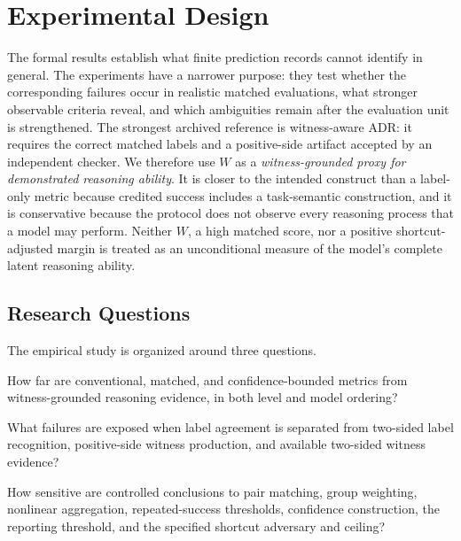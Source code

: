 \documentclass[acmsmall,screen,review,anonymous]{acmart}
\providecommand{\WitnessRate}{W}
\newcounter{experiment}
\begin{document}
\section{Experimental Design}
\label{sec:experimental-design}

The formal results establish what finite prediction records cannot identify in
general. The experiments have a narrower purpose: they test whether the
corresponding failures occur in realistic matched evaluations, what stronger
observable criteria reveal, and which ambiguities remain after the evaluation
unit is strengthened. The strongest archived reference is witness-aware ADR:
it requires the correct matched labels and a positive-side artifact accepted by
an independent checker. We therefore use \(\WitnessRate\) as a
\emph{witness-grounded proxy for demonstrated reasoning ability}. It is closer
to the intended construct than a label-only metric because credited success
includes a task-semantic construction, and it is conservative because the
protocol does not observe every reasoning process that a model may perform.
Neither \(\WitnessRate\), a high matched score, nor a positive shortcut-adjusted
margin is treated as an unconditional measure of the model's complete latent
reasoning ability.

\subsection{Research Questions}
\label{sec:experimental-rqs}

The empirical study is organized around three questions.

\begin{description}[leftmargin=0.12in,labelindent=0in]
\item[\textbf{RQ1.}] How far are conventional, matched, and confidence-bounded
metrics from witness-grounded reasoning evidence, in both level and model
ordering?

\item[\textbf{RQ2.}] What failures are exposed when label agreement is separated
from two-sided label recognition, positive-side witness production, and
available two-sided witness evidence?

\item[\textbf{RQ3.}] How sensitive are controlled conclusions to pair matching,
group weighting, nonlinear aggregation, repeated-success thresholds,
confidence construction, the reporting threshold, and the specified shortcut
adversary and ceiling?

\end{description}
\end{document}
